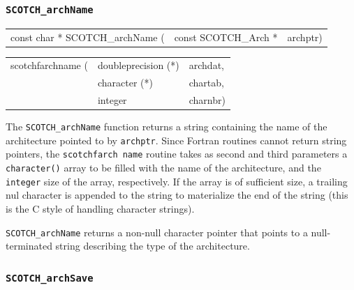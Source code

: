 \subsubsection{{\tt SCOTCH\_archName}}

\begin{itemize}
\progsyn

{\tt\begin{tabular}{l@{}ll}
const char * SCOTCH\_archName ( & const SCOTCH\_Arch * & archptr)
\end{tabular}}

{\tt\begin{tabular}{l@{}ll}
scotchfarchname ( & doubleprecision (*) & archdat, \\
                  & character (*)       & chartab, \\
                  & integer             & charnbr)
\end{tabular}}

\progdes

The {\tt SCOTCH\_archName} function returns a string containing the
name of the architecture pointed to by {\tt archptr}. Since Fortran
routines cannot return string pointers, the {\tt scotchf\lbt arch\lbt
name} routine takes as second and third parameters a {\tt character()}
array to be filled with the name of the architecture, and the {\tt
integer} size of the array, respectively. If the array is of
sufficient size, a trailing nul character is appended to the string to
materialize the end of the string (this is the C style of handling
character strings).

\progret

{\tt SCOTCH\_archName} returns a non-null character pointer that points
to a null-terminated string describing the type of the architecture.
\end{itemize}

\subsubsection{{\tt SCOTCH\_archSave}}

